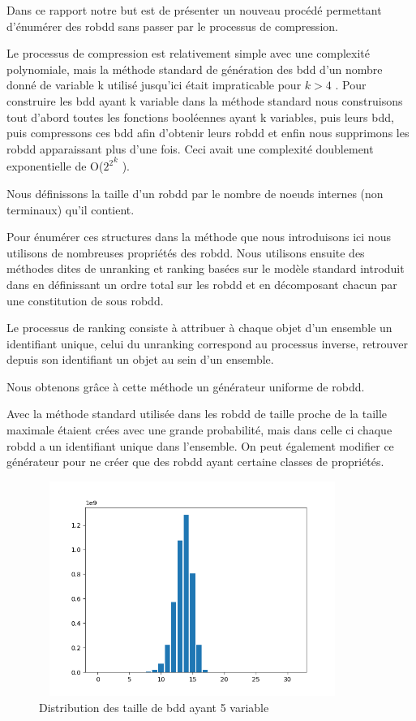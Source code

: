 \documentclass[french]{article}
\begin{document}
Dans ce rapport notre but est de présenter un nouveau procédé permettant d'énumérer des robdd sans passer par le processus de compression.\medskip

Le processus de compression est relativement simple avec une complexité polynomiale, mais la méthode standard de génération des bdd d'un nombre donné de variable k utilisé jusqu'ici était impraticable pour {\(k > 4\)} \cite{newton}. Pour construire les bdd ayant k variable dans la méthode standard nous construisons tout d'abord toutes les fonctions booléennes ayant k variables, puis leurs bdd, puis compressons ces bdd afin d'obtenir leurs robdd et enfin nous supprimons les robdd apparaissant plus d'une fois. Ceci avait une complexité doublement exponentielle de  O(\( {2^2}^k\) ).\medskip

Nous définissons la taille d'un robdd par le nombre de noeuds internes (non terminaux) qu'il contient.

Pour énumérer ces structures dans la méthode que nous introduisons ici nous utilisons de nombreuses propriétés des robdd.  Nous utilisons ensuite des méthodes dites de unranking et ranking basées sur le modèle standard introduit dans \cite{wilf} en définissant un ordre total sur les robdd et en décomposant chacun par une constitution de sous robdd.

Le processus de ranking consiste à attribuer à chaque objet d'un ensemble un identifiant unique, celui du unranking correspond au processus inverse, retrouver depuis son identifiant un objet au sein d'un ensemble.\medskip

Nous obtenons grâce à cette méthode un générateur uniforme de robdd.\medskip

Avec la méthode standard utilisée dans \cite{newton} les robdd de taille proche de la taille maximale étaient crées avec une grande probabilité, mais dans celle ci chaque robdd a un identifiant unique dans l'ensemble. On peut également modifier ce générateur pour ne créer que des robdd ayant certaine classes de propriétés.

\begin{figure}[htp]
    \centering
    \includegraphics[width=10cm, height=7cm]{index5}
    \caption{Distribution des taille de bdd ayant 5 variable}
    \label{fig:Figure1.2}
\end{figure}
\end{document}
